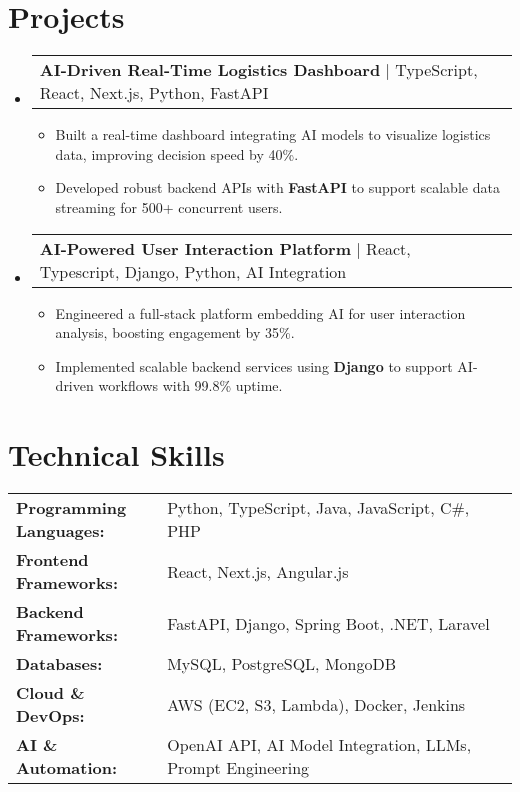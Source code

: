 \documentclass[letterpaper,11pt]{article}
\makeatletter
\newcommand{\resumeItem}[1]{
  \item\footnotesize{
    {#1 \vspace{-2pt}}
  }
}
\newcommand{\resumeProjectHeading}[2]{
    \item
    \begin{tabular*}{1.001\textwidth}{l@{\extracolsep{\fill}}r}
      \small#1 & \textbf{\small #2}\\
    \end{tabular*}\vspace{-7pt}
}
\newcommand{\resumeSubHeadingListStart}{\begin{itemize}[leftmargin=0pt, label={}]}
\newcommand{\resumeSubHeadingListEnd}{\end{itemize}}
\newcommand{\resumeItemListStart}{\begin{itemize}[leftmargin=*]}
\newcommand{\resumeItemListEnd}{\end{itemize}\vspace{-5pt}}
\makeatother
\begin{document}
\section{Projects}
    \vspace{-5pt}
    \resumeSubHeadingListStart
      \resumeProjectHeading
          {\textbf{AI-Driven Real-Time Logistics Dashboard} | TypeScript, React, Next.js, Python, FastAPI}{}
          \resumeItemListStart
              \resumeItem{Built a real-time dashboard integrating AI models to visualize logistics data, improving decision speed by 40\%.}
              \resumeItem{Developed robust backend APIs with \textbf{FastAPI} to support scalable data streaming for 500+ concurrent users.}
          \resumeItemListEnd
          \vspace{-16pt}
      \resumeProjectHeading
          {\textbf{AI-Powered User Interaction Platform} | React, Typescript, Django, Python, AI Integration}{}
          \resumeItemListStart
              \resumeItem{Engineered a full-stack platform embedding AI for user interaction analysis, boosting engagement by 35\%.}
              \resumeItem{Implemented scalable backend services using \textbf{Django} to support AI-driven workflows with 99.8\% uptime.}
          \resumeItemListEnd
          \vspace{-16pt}
    \resumeSubHeadingListEnd
\vspace{-10pt}
\section{Technical Skills}
        \vspace{-14pt}
        \begin{table}[h]
            \footnotesize
            \begin{tabular}{p{0.3\linewidth} p{0.7\linewidth}}
                \textbf{Programming Languages:} & Python, TypeScript, Java, JavaScript, C\#, PHP \\
                \textbf{Frontend Frameworks:} & React, Next.js, Angular.js \\
                \textbf{Backend Frameworks:} & FastAPI, Django, Spring Boot, .NET, Laravel \\
                \textbf{Databases:} & MySQL, PostgreSQL, MongoDB \\
                \textbf{Cloud \& DevOps:} & AWS (EC2, S3, Lambda), Docker, Jenkins \\
                \textbf{AI \& Automation:} & OpenAI API, AI Model Integration, LLMs, Prompt Engineering \\
            \end{tabular}
        \end{table}
\end{document}
